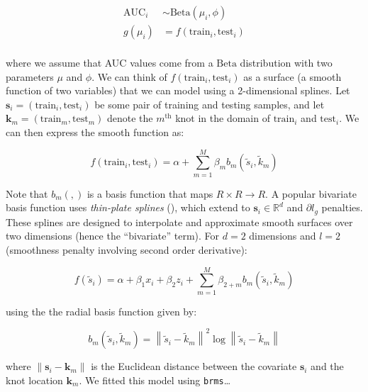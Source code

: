 \documentclass[
  man,
  floatsintext,
  longtable,
  a4paper,
  nolmodern,
  notxfonts,
  notimes,
  colorlinks=true,linkcolor=blue,citecolor=blue,urlcolor=blue]{apa7}
\begin{document}
\[
\begin{aligned}
\text{AUC}_{i} &\sim \mathrm{Beta}(\mu_{i}, \phi)\\
g(\mu_{i}) &= f \left(\text{train}_{i}, \text{test}_{i} \right)\\
\end{aligned}
\]

where we assume that AUC values come from a \(\mathrm{Beta}\)
distribution with two parameters \(\mu\) and \(\phi\). We can think of
\(f \left(\text{train}_{i}, \text{test}_{i} \right)\) as a surface (a
smooth function of two variables) that we can model using a
2-dimensional splines. Let
\(\mathbf{s}_{i} = \left(\text{train}_{i}, \text{test}_{i} \right)\) be
some pair of training and testing samples, and let
\(\mathbf{k}_{m} = \left(\text{train}_{m}, \text{test}_{m} \right)\)
denote the \(m^{\text{th}}\) knot in the domain of \(\text{train}_{i}\)
and \(\text{test}_{i}\). We can then express the smooth function as:

\[
f \left(\text{train}_{i}, \text{test}_{i} \right) = \alpha + \sum_{m=1}^M \beta_{m} b_{m} \left(\tilde{s}_{i}, \tilde{k}_{m} \right)
\]

Note that \(b_{m}(,)\) is a basis function that maps
\(R \times R \rightarrow R\). A popular bivariate basis function uses
\emph{thin-plate splines} (), which
extend to \(\mathbf{s}_{i} \in \mathbb{R}^{d}\) and \(\partial l_{g}\)
penalties. These splines are designed to interpolate and approximate
smooth surfaces over two dimensions (hence the ``bivariate'' term). For
\(d=2\) dimensions and \(l=2\) (smoothness penalty involving second
order derivative):

\[
f \left(\tilde{s}_{i} \right) = \alpha + \beta_{1} x_{i} + \beta_{2} z_{i} +\sum_{m=1}^{M} \beta_{2+m} b_m\left(\tilde{s}_i, \tilde{k}_m\right)
\]

using the the radial basis function given by:

\[
b_m\left(\tilde{s}_i, \tilde{k}_m\right)=\left\|\tilde{s}_i-\tilde{k}_m\right\|^2 \log \left\|\tilde{s}_i-\tilde{k}_m\right\|
\]

where \(\left\|\mathbf{s}_i-\mathbf{k}_{m}\right\|\) is the Euclidean
distance between the covariate \(\mathbf{s}_{i}\) and the knot location
\(\mathbf{k}_{m}\). We fitted this model using \texttt{brms}\ldots{}
\end{document}
